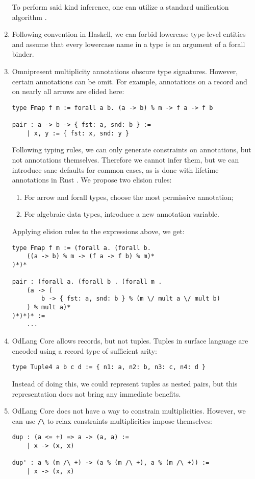 \documentclass[a4paper,14pt]{extreport}
\begin{document}
\begin{enumerate}
        To perform said kind inference, one can utilize a standard unification
        algorithm \cite{milner}.
    \item Following convention in Haskell, we can forbid lowercase type-level
        entities and assume that every lowercase name in a type is an argument
        of a forall binder.
    \item Omnipresent multiplicity annotations obscure type signatures.
        However, certain annotations can be omit. For example, annotations on a
        record and on nearly all arrows are elided here:
\begin{verbatim}
type Fmap f m := forall a b. (a -> b) % m -> f a -> f b

pair : a -> b -> { fst: a, snd: b } :=
    | x, y := { fst: x, snd: y }
\end{verbatim}
        Following typing rules, we can only generate constraints on annotations,
        but not annotations themselves. Therefore we cannot infer them, but we
        can introduce sane defaults for common cases, as is done with lifetime
        annotations in Rust \cite{elision}. We propose two elision rules:
        \begin{enumerate}
            \item For arrow and forall types, choose the most permissive
                annotation;
            \item For algebraic data types, introduce a new annotation variable.
        \end{enumerate}
        Applying elision rules to the expressions above, we get:
\begin{verbatim}
type Fmap f m := (forall a. (forall b.
    ((a -> b) % m -> (f a -> f b) % m)*
)*)*

pair : (forall a. (forall b . (forall m .
    (a -> (
        b -> { fst: a, snd: b } % (m \/ mult a \/ mult b)
    ) % mult a)*
)*)*)* :=
    ...
\end{verbatim}
    \item OdLang Core allows records, but not tuples. Tuples in surface language
        are encoded using a record type of sufficient arity:
\begin{verbatim}
type Tuple4 a b c d := { n1: a, n2: b, n3: c, n4: d }
\end{verbatim}
        Instead of doing this, we could represent tuples as nested pairs, but
        this representation does not bring any immediate benefits.
    \item OdLang Core does not have a way to constrain multiplicities. However,
        we can use \verb|/\| to relax constraints multiplicities impose
        themselves:
\begin{verbatim}
dup : (a <= +) => a -> (a, a) :=
    | x -> (x, x)

dup' : a % (m /\ +) -> (a % (m /\ +), a % (m /\ +)) :=
    | x -> (x, x)
\end{verbatim}
\end{enumerate}
\end{document}
